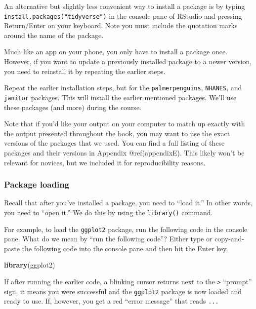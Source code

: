 \documentclass[
]{article}
\newenvironment{Shaded}{\begin{snugshade}}{\end{snugshade}}
\newcommand{\KeywordTok}[1]{\textcolor[rgb]{0.13,0.29,0.53}{\textbf{#1}}}
\newcommand{\NormalTok}[1]{#1}
\begin{document}
An alternative but slightly less convenient way to install a package is
by typing \texttt{install.packages("tidyverse")} in the console pane of
RStudio and pressing Return/Enter on your keyboard. Note you must
include the quotation marks around the name of the package.

Much like an app on your phone, you only have to install a package once.
However, if you want to update a previously installed package to a newer
version, you need to reinstall it by repeating the earlier steps.

Repeat the earlier installation steps, but for the
\texttt{palmerpenguins}, \texttt{NHANES}, and \texttt{janitor} packages.
This will install the earlier mentioned packages. We'll use these
packages (and more) during the course.

Note that if you'd like your output on your computer to match up exactly
with the output presented throughout the book, you may want to use the
exact versions of the packages that we used. You can find a full listing
of these packages and their versions in Appendix @ref(appendixE). This
likely won't be relevant for novices, but we included it for
reproducibility reasons.

\hypertarget{package-loading}{%
\subsubsection{Package loading}\label{package-loading}}

Recall that after you've installed a package, you need to ``load it.''
In other words, you need to ``open it.'' We do this by using the
\texttt{library()} command. 

For example, to load the \texttt{ggplot2} package, run the following
code in the console pane. What do we mean by ``run the following code''?
Either type or copy-and-paste the following code into the console pane
and then hit the Enter key.

\begin{Shaded}
\begin{Highlighting}[]
\KeywordTok{library}\NormalTok{(ggplot2)}
\end{Highlighting}
\end{Shaded}

If after running the earlier code, a blinking cursor returns next to the
\texttt{\textgreater{}} ``prompt'' sign, it means you were successful
and the \texttt{ggplot2} package is now loaded and ready to use. If,
however, you get a red ``error message'' that reads \texttt{...}
\end{document}
